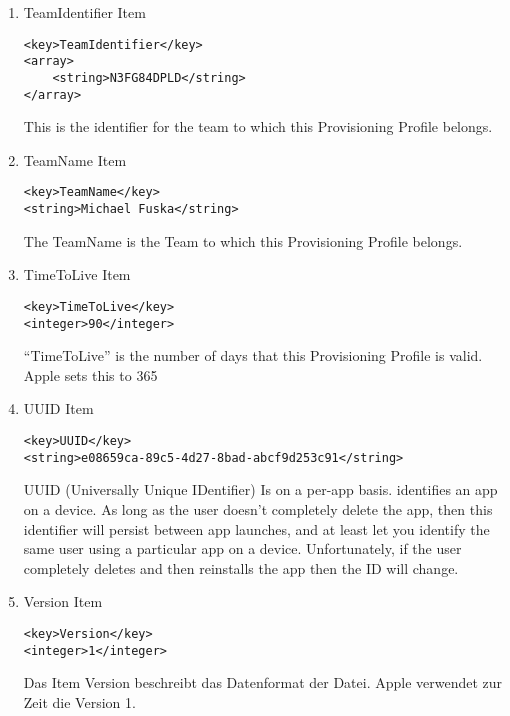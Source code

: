 \begin{enumerate}
    \item TeamIdentifier Item
\begin{lstlisting}[caption={TeamIdentifier Item}]
<key>TeamIdentifier</key>
<array>
    <string>N3FG84DPLD</string>
</array>
\end{lstlisting}
This is the identifier for the team to which this Provisioning Profile belongs.

    \item TeamName Item
\begin{lstlisting}[caption={TeamName Item}]
<key>TeamName</key>
<string>Michael Fuska</string>
\end{lstlisting}
 The TeamName is the Team to which this Provisioning Profile belongs.

   \item TimeToLive Item
\begin{lstlisting}[caption={TimeToLive Item}]
<key>TimeToLive</key>
<integer>90</integer>
\end{lstlisting}
“TimeToLive” is the number of days that this Provisioning Profile is valid. Apple sets this to 365
 
    \item UUID Item
\begin{lstlisting}[caption={UUID Item}]
<key>UUID</key>
<string>e08659ca-89c5-4d27-8bad-abcf9d253c91</string>
\end{lstlisting}
UUID (Universally Unique IDentifier) Is on a per-app basis. identifies an app on a device. As long as the user doesn’t completely delete the app, then this identifier will persist between app launches, and at least let you identify the same user using a particular app on a device. Unfortunately, if the user completely deletes and then reinstalls the app then the ID will change.

    \item Version Item
\begin{lstlisting}[caption={Version Item}]
<key>Version</key>
<integer>1</integer> 
\end{lstlisting}
Das Item Version beschreibt das Datenformat der Datei. Apple verwendet zur Zeit die Version 1.    
\end{enumerate}





